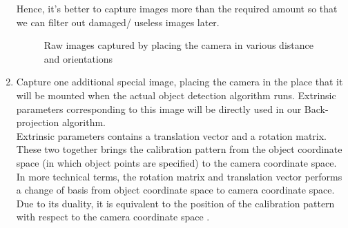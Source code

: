 \documentclass[a4paper,12pt]{report}%
\begin{document}
\begin{enumerate}
\begin{itemize}
	\end{itemize}
	Hence, it's better to capture images more than the required amount so that we can filter out damaged/ useless images later. 
	
	\begin{figure}[H]
		\centering
		\caption{Raw images captured by placing the camera in various distance and orientations}
		\label{fig:rawimages}
	\end{figure}
	
	\item Capture one additional special image, placing the camera in the place that it will be mounted when the actual object detection algorithm runs. Extrinsic parameters\cite{hartley_zisserman_2004} corresponding to this image will be directly used in our Back-projection algorithm.\\
	
	Extrinsic parameters contains a translation vector and a rotation matrix. These two together brings the calibration pattern from the object coordinate space (in which object points are specified) to the camera coordinate space. In more technical terms, the rotation matrix and translation vector performs a change of basis from object coordinate space to camera coordinate space. Due to its duality, it is equivalent to the position of the calibration pattern with respect to the camera coordinate space \cite{backproject:_nodate-1}.\\
	
	\begin{figure}[H]
		\centering
\end{figure}
\end{enumerate}
\end{document}

